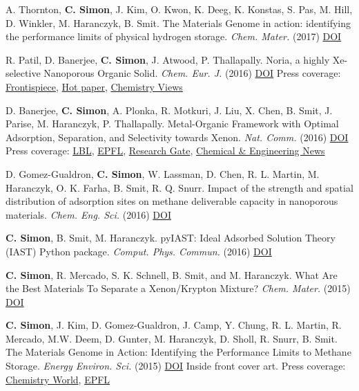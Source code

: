 \documentclass[10pt,a4paper,sans]{moderncv}        %
\begin{document}
\begin{etaremune}[itemsep=0pt]
\item A. Thornton, \textbf{C. Simon}, J. Kim, O. Kwon, K. Deeg, K. Konstas, S. Pas, M. Hill, D. Winkler, M. Haranczyk, B. Smit. The Materials Genome in action: identifying the performance limits of physical hydrogen storage. \emph{Chem. Mater.} (2017) \href{http://dx.doi.org/10.1021/acs.chemmater.6b04933}{DOI} 
\item R. Patil, D. Banerjee, \textbf{C. Simon}, J. Atwood, P. Thallapally. Noria, a highly Xe-selective Nanoporous Organic Solid. \emph{Chem. Eur. J.} (2016) \href{http://dx.doi.org/10.1002/chem.201602131}{DOI} 
Press coverage: \href{http://onlinelibrary.wiley.com/doi/10.1002/chem.201683661/full}{Frontispiece}, \href{http://www.wiley-vch.de/publish/en/journals/alphabeticIndex/2111/news/40104/?sID=t5djjts194ffu97p27174b3j20}{Hot paper}, \href{http://www.chemistryviews.org/details/ezine/9622851/Recovering_Xenon_from_Waste.html}{Chemistry Views}
\item D. Banerjee, \textbf{C. Simon}, A. Plonka, R. Motkuri, J. Liu, X. Chen, B. Smit, J. Parise, M. Haranczyk, P. Thallapally. Metal-Organic Framework with Optimal Adsorption, Separation, and Selectivity towards Xenon. \emph{Nat. Comm.} (2016) \href{http://dx.doi.org/10.1038/ncomms11831}{DOI} Press coverage: \href{http://cs.lbl.gov/news-media/news/2016/sbmof-1/}{LBL}, \href{http://actu.epfl.ch/news/a-new-material-can-clear-up-nuclear-waste-gases/}{EPFL}, \href{https://www.researchgate.net/blog/post/new-material-can-safely-and-efficiently-deal-with-nuclear-waste-gases}{Research Gate}, \href{http://cen.acs.org/articles/94/i26/Selective-sorbent-traps-xenon-krypton.html}{Chemical \& Engineering News}
\item D. Gomez-Gualdron, \textbf{C. Simon}, W. Lassman, D. Chen, R. L. Martin, M. Haranczyk, O. K. Farha, B. Smit, R. Q. Snurr. Impact of the strength and spatial distribution of adsorption sites on methane deliverable capacity in nanoporous materials. \emph{Chem. Eng. Sci.} (2016) \href{http://dx.doi.org/10.1016/j.ces.2016.02.030}{DOI}
\item \textbf{C. Simon}, B. Smit, M. Haranczyk. pyIAST: Ideal Adsorbed Solution Theory (IAST) Python package. \emph{Comput. Phys. Commun.} (2016) \href{http://dx.doi.org/doi:10.1016/j.cpc.2015.11.016}{DOI}
\item \textbf{C. Simon}, R. Mercado, S. K. Schnell, B. Smit, and M. Haranczyk. What Are the Best Materials To Separate a Xenon/Krypton Mixture? \emph{Chem. Mater.} (2015) \href{http://dx.doi.org/10.1021/acs.chemmater.5b01475}{DOI}
\item \textbf{C. Simon}, J. Kim, D. Gomez-Gualdron, J. Camp, Y. Chung, R. L. Martin, R. Mercado, M.W. Deem, D. Gunter, M. Haranczyk, D. Sholl, R. Snurr, B. Smit. The Materials Genome in Action: Identifying the Performance Limits to Methane Storage. \emph{Energy Environ. Sci.} (2015) \href{http://dx.doi.org/10.1039/C4EE03515A}{DOI} Inside front cover art. Press coverage: \href{http://www.rsc.org/chemistryworld/2015/02/mof-methane-storage-materials-genome-initiative}{Chemistry World}, \href{http://actu.epfl.ch/news/methane-storage-targets-are-too-high/}{EPFL}

\end{etaremune}
\end{document}
